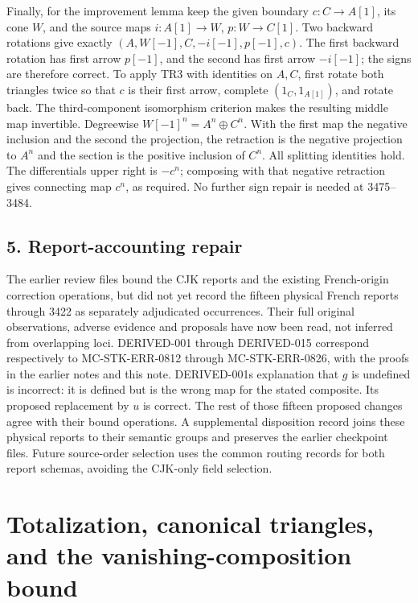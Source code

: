 \documentclass[11pt]{article}
\begin{document}
Finally,\allowbreak{} for the improvement lemma keep the given boundary \(c:C\to A[1]\),\allowbreak{} its cone \(W\),\allowbreak{} and the source maps \(i:A[1]\to W\),\allowbreak{} \(p:W\to C[1]\). Two backward rotations give exactly \((A,W[-1],C,-i[-1],p[-1],c)\). The first backward rotation has first arrow \(p[-1]\),\allowbreak{} and the second has first arrow \(-i[-1]\); the signs are therefore correct. To apply TR3 with identities on \(A,C\),\allowbreak{} first rotate both triangles twice so that \(c\) is their first arrow,\allowbreak{} complete \((1_C,1_{A[1]})\),\allowbreak{} and rotate back. The third-component isomorphism criterion makes the resulting middle map invertible. Degreewise \(W[-1]^n=A^n\oplus C^n\). With the first map the negative inclusion and the second the projection,\allowbreak{} the retraction is the negative projection to \(A^n\) and the section is the positive inclusion of \(C^n\). All splitting identities hold. The differential\textquotesingle s upper right is \(-c^n\); composing with that negative retraction gives connecting map \(c^n\),\allowbreak{} as required. No further sign repair is needed at 3475–\allowbreak{}3484.

\subsection{5. Report-accounting repair}\label{proofs-2995-3485-report-accounting-repair}

The earlier review files bound the CJK reports and the existing French-origin correction operations,\allowbreak{} but did not yet record the fifteen physical French reports through 3422 as separately adjudicated occurrences. Their full original observations,\allowbreak{} adverse evidence and proposals have now been read,\allowbreak{} not inferred from overlapping loci. DERIVED-001 through DERIVED-015 correspond respectively to MC-STK-ERR-0812 through MC-STK-ERR-0826,\allowbreak{} with the proofs in the earlier notes and this note. DERIVED-001\textquotesingle s explanation that \(g\) is undefined is incorrect:\allowbreak{} it is defined but is the wrong map for the stated composite. Its proposed replacement by \(u\) is correct. The rest of those fifteen proposed changes agree with their bound operations. A supplemental disposition record joins these physical reports to their semantic groups and preserves the earlier checkpoint files. Future source-order selection uses the common routing records for both report schemas,\allowbreak{} avoiding the CJK-only field selection.
\clearpage
\section{\texorpdfstring{Totalization,\allowbreak{} canonical triangles,\allowbreak{} and the vanishing-composition bound}{ canonical  and the vanishing-composition bound}}\label{proofs-3487-4161-totalization-canonical-triangles-and-the-vanishing-composition-bound}
\end{document}
